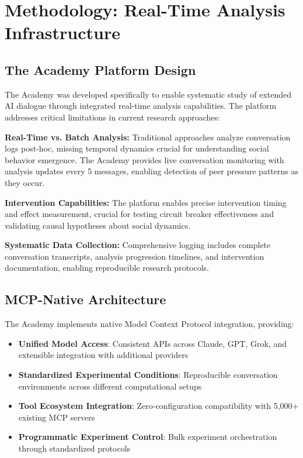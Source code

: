 \documentclass[11pt,letterpaper]{article}
\newcommand{\theacademy}{The Academy}
\begin{document}
\section{Methodology: Real-Time Analysis Infrastructure}

\subsection{The Academy Platform Design}

\theacademy{} was developed specifically to enable systematic study of extended AI dialogue through integrated real-time analysis capabilities. The platform addresses critical limitations in current research approaches:

\textbf{Real-Time vs. Batch Analysis:} Traditional approaches analyze conversation logs post-hoc, missing temporal dynamics crucial for understanding social behavior emergence. \theacademy{} provides live conversation monitoring with analysis updates every 5 messages, enabling detection of peer pressure patterns as they occur.

\textbf{Intervention Capabilities:} The platform enables precise intervention timing and effect measurement, crucial for testing circuit breaker effectiveness and validating causal hypotheses about social dynamics.

\textbf{Systematic Data Collection:} Comprehensive logging includes complete conversation transcripts, analysis progression timelines, and intervention documentation, enabling reproducible research protocols.

\subsection{MCP-Native Architecture}

\theacademy{} implements native Model Context Protocol integration, providing:

\begin{itemize}
    \item \textbf{Unified Model Access}: Consistent APIs across Claude, GPT, Grok, and extensible integration with additional providers
    \item \textbf{Standardized Experimental Conditions}: Reproducible conversation environments across different computational setups
    \item \textbf{Tool Ecosystem Integration}: Zero-configuration compatibility with 5,000+ existing MCP servers
    \item \textbf{Programmatic Experiment Control}: Bulk experiment orchestration through standardized protocols
\end{itemize}
\end{document}
